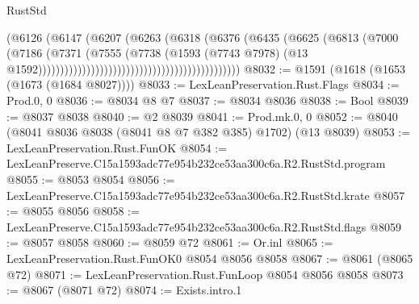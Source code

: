 \begin{lexlean}{RustStd}
\begin{coremodule}
                                                                (@6126
                                                                  (@6147
                                                                    (@6207
                                                                      (@6263
                                                                        (@6318
                                                                          (@6376
                                                                            (@6435
                                                                              (@6625
                                                                                (@6813
                                                                                  (@7000
                                                                                    (@7186
                                                                                      (@7371
                                                                                        (@7555
                                                                                          (@7738
                                                                                            (@1593
                                                                                              (@7743
                                                                                                @7978)
                                                                                              (@13
                                                                                                @1592))))))))))))))))))))))))))))))))))))))))))))))
@8032 := @1591 (@1618 (@1653 (@1673 (@1684 @8027))))
@8033 := LexLeanPreservation.Rust.Flags
@8034 := Prod.{0, 0}
@8036 := @8034 @8 @7
@8037 := @8034 @8036
@8038 := Bool
@8039 := @8037 @8038
@8040 := @2 @8039
@8041 := Prod.mk.{0, 0}
@8052 := @8040 (@8041 @8036 @8038 (@8041 @8 @7 @382 @385) @1702) (@13 @8039)
@8053 := LexLeanPreservation.Rust.FunOK
@8054 := LexLeanPreserve.C15a1593adc77e954b232ce53aa300c6a.R2.RustStd.program
@8055 := @8053 @8054
@8056 := LexLeanPreserve.C15a1593adc77e954b232ce53aa300c6a.R2.RustStd.krate
@8057 := @8055 @8056
@8058 := LexLeanPreserve.C15a1593adc77e954b232ce53aa300c6a.R2.RustStd.flags
@8059 := @8057 @8058
@8060 := @8059 @72
@8061 := Or.inl
@8065 := LexLeanPreservation.Rust.FunOK0 @8054 @8056 @8058
@8067 := @8061 (@8065 @72)
@8071 := LexLeanPreservation.Rust.FunLoop @8054 @8056 @8058
@8073 := @8067 (@8071 @72)
@8074 := Exists.intro.{1}

\end{coremodule}
\end{lexlean}
